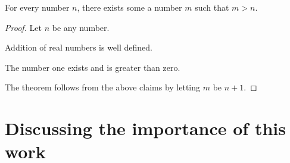 \begin{theorem}
	For every number $n$, there exists some a number $m$ such that $m > n$.
\end{theorem}

\begin{proof}
	Let $n$ be any number.
	\begin{claim}
		Addition of real numbers is well defined.
	\end{claim}
	\begin{claim}
		The number one exists and is greater than zero.
	\end{claim}
	The theorem follows from the above claims by letting $m$ be $n+1$.
\end{proof}

\blindtext

\section{Discussing the importance of this work}

\blindtext[2]
